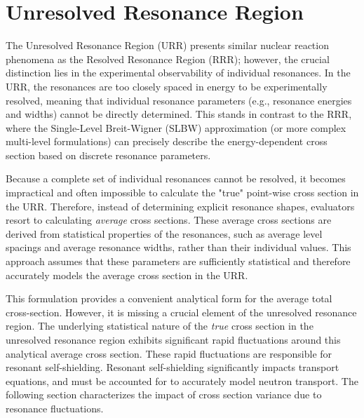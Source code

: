 \section{Unresolved Resonance Region}
\label{sec:unresolved-resonance-region}

The Unresolved Resonance Region (URR) presents similar nuclear reaction phenomena as the Resolved Resonance Region (RRR); however, the crucial distinction lies in the experimental observability of individual resonances. In the URR, the resonances are too closely spaced in energy to be experimentally resolved, meaning that individual resonance parameters (e.g., resonance energies and widths) cannot be directly determined. This stands in contrast to the RRR, where the Single-Level Breit-Wigner (SLBW) approximation (or more complex multi-level formulations) can precisely describe the energy-dependent cross section based on discrete resonance parameters.

Because a complete set of individual resonances cannot be resolved, it becomes impractical and often impossible to calculate the "true" point-wise cross section in the URR. Therefore, instead of determining explicit resonance shapes, evaluators resort to calculating \textit{average} cross sections. These average cross sections are derived from statistical properties of the resonances, such as average level spacings and average resonance widths, rather than their individual values. This approach assumes that these parameters are sufficiently statistical and therefore accurately models the average cross section in the URR.

This formulation provides a convenient analytical form for the average total cross-section. However, it is missing a crucial element of the unresolved resonance region. The underlying statistical nature of the \textit{true} cross section in the unresolved resonance region exhibits significant rapid fluctuations around this analytical average cross section. These rapid fluctuations are responsible for resonant self-shielding. Resonant self-shielding significantly impacts transport equations, and must be accounted for to accurately model neutron transport. The following section characterizes the impact of cross section variance due to resonance fluctuations.

